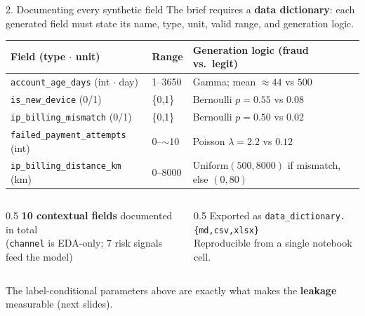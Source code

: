 \documentclass[aspectratio=169]{beamer}
\newcommand{\good}[1]{\textcolor{good}{\textbf{#1}}}
\newcommand{\warn}[1]{\textcolor{hustdark}{\textbf{#1}}}
\begin{document}
\begin{frame}{2. Documenting every synthetic field}
The brief requires a \textbf{data dictionary}: each generated field must state
its name, type, unit, valid range, and generation logic.

\begin{table}
\centering
\scriptsize
\begin{tabular}{lll}
\toprule
Field (type $\cdot$ unit) & Range & Generation logic (fraud vs.\ legit) \\
\midrule
\texttt{account\_age\_days} (int $\cdot$ day)   & 1--3650       & Gamma; mean $\approx 44$ vs $500$ \\
\texttt{is\_new\_device} (0/1)                   & \{0,1\}       & Bernoulli $p = 0.55$ vs $0.08$ \\
\texttt{ip\_billing\_mismatch} (0/1)             & \{0,1\}       & Bernoulli $p = 0.50$ vs $0.02$ \\
\texttt{failed\_payment\_attempts} (int)         & $0$--$\sim$10 & Poisson $\lambda = 2.2$ vs $0.12$ \\
\texttt{ip\_billing\_distance\_km} (km)          & 0--8000       & Uniform$(500,8000)$ if mismatch, else $(0,80)$ \\
\bottomrule
\end{tabular}
\end{table}

\begin{columns}[T]
\begin{column}{0.5\textwidth}
\good{10 contextual fields} documented in total\\
(\texttt{channel} is EDA-only; 7 risk signals feed the model)
\end{column}
\begin{column}{0.5\textwidth}
Exported as \texttt{data\_dictionary.\{md,csv,xlsx\}}\\
\footnotesize Reproducible from a single notebook cell.
\end{column}
\end{columns}

\vspace{0.4em}
\centering
\footnotesize The label-conditional parameters above are exactly what makes the
\warn{leakage} measurable (next slides).
\end{frame}
\end{document}
